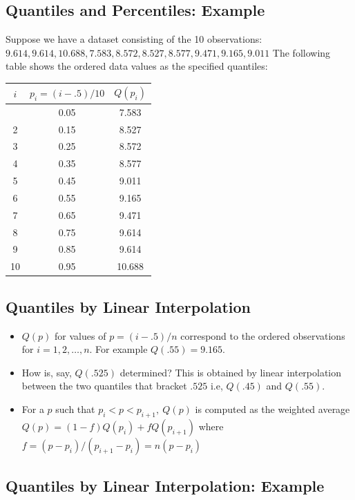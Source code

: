 \documentclass[
  letterpaper,
  DIV=11,
  numbers=noendperiod]{scrartcl}
\begin{document}
\subsection{Quantiles and Percentiles:
Example}\label{quantiles-and-percentiles-example}

Suppose we have a dataset consisting of the 10 observations:
\(9.614,  9.614,  10.688,  7.583,  8.572,  8.527,  8.577,  9.471,
9.165,  9.011\) The following table shows the ordered data values as the
specified {quantiles}:

\begin{longtable}[]{@{}ccc@{}}
\toprule\noalign{}
\(i\) & \(p_i=(i-.5)/10\) & \(Q(p_i)\) \\
\midrule\noalign{}
\endhead
\bottomrule\noalign{}
\endlastfoot
1 & 0.05 & 7.583 \\
2 & 0.15 & 8.527 \\
3 & 0.25 & 8.572 \\
4 & 0.35 & 8.577 \\
5 & 0.45 & 9.011 \\
6 & 0.55 & 9.165 \\
7 & 0.65 & 9.471 \\
8 & 0.75 & 9.614 \\
9 & 0.85 & 9.614 \\
10 & 0.95 & 10.688 \\
\end{longtable}

\subsection{Quantiles by Linear
Interpolation}\label{quantiles-by-linear-interpolation}

\begin{itemize}
\item
  \(Q(p)\) for values of \(p = (i-.5)/n\) correspond to the ordered
  observations for \(i = 1, 2, \ldots, n\). For example
  \(Q(.55)=9.165\).
\item
  How is, say, \(Q(.525)\) determined? This is obtained by linear
  interpolation between the two quantiles that bracket \(.525\) i.e,
  \(Q(.45)\) and \(Q(.55)\).
\item
  For a \(p\) such that \(p_i < p < p_{i+1},\ Q(p)\) is computed as the
  weighted average \(Q(p) = (1-f)Q(p_i) + fQ(p_{i+1})\) where
  \(f =(p-p_i)/(p_{i+1}-p_i) = n(p-p_i)\)
\end{itemize}

\subsection{Quantiles by Linear Interpolation:
Example}\label{quantiles-by-linear-interpolation-example}
\end{document}
